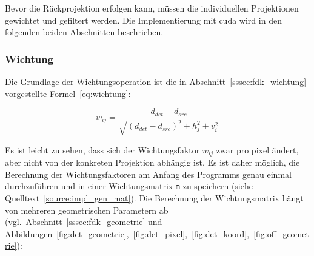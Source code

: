 Bevor die Rückprojektion erfolgen kann, müssen die individuellen Projektionen gewichtet und gefiltert werden. Die
Implementierung mit \gls{cuda} wird in den folgenden beiden Abschnitten beschrieben.

\subsubsection{Wichtung}

Die Grundlage der Wichtungsoperation ist die in Abschnitt~\ref{sssec:fdk_wichtung} vorgestellte
Formel~\ref{eq:wichtung}:

\begin{equation*}
    w_{ij} = \frac{d_{det} - d_{src}}{\sqrt{(d_{det} - d_{src})^2 + h_j^2 + v_i^2}}
\end{equation*}

Es ist leicht zu sehen, dass sich der Wichtungsfaktor $w_{ij}$ zwar pro \gls{pixel} ändert, aber nicht von der konkreten
Projektion abhängig ist. Es ist daher möglich, die Berechnung der Wichtungsfaktoren am Anfang des Programms genau einmal
durchzuführen und in einer Wichtungsmatrix \texttt{m} zu speichern (siehe Quelltext~\ref{source:impl_gen_mat}). Die
Berechnung der Wichtungsmatrix hängt von mehreren geometrischen Parametern ab (vgl.\
Abschnitt~\ref{sssec:fdk_geometrie} und Abbildungen~\ref{fig:det_geometrie},~\ref{fig:det_pixel},~\ref{fig:det_koord},~\ref{fig:off_geometrie}):

